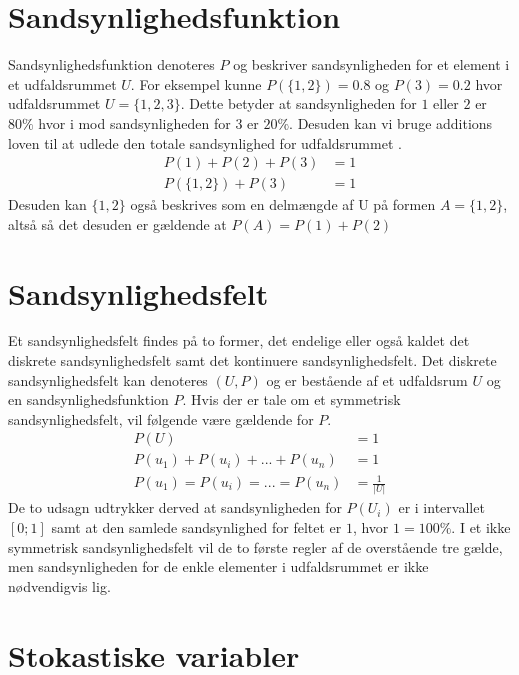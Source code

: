 \documentclass[../../SRP.tex]{subfiles}
\begin{document}
\section{Sandsynlighedsfunktion}

Sandsynlighedsfunktion denoteres $P$ og beskriver sandsynligheden for et element i et udfaldsrummet $U$. For eksempel kunne $P(\{1,2\}) = 0.8$ og $P(3) = 0.2$ hvor udfaldsrummet $U = \{1,2,3\}$. Dette betyder at sandsynligheden for $1$ eller $2$ er $80\%$ hvor i mod sandsynligheden for $3$ er $20\%$. Desuden kan vi bruge additions loven til at udlede den totale sandsynlighed for udfaldsrummet \cite{SC}.
\begin{align}
  P(1) + P(2) + P(3) &= 1 \\
  P(\{1,2\}) + P(3) &= 1
\end{align}
Desuden kan $\{1,2\}$ også beskrives som en delmængde af U på formen $A = \{1,2\}$, altså så det desuden er gældende at $P(A) = P(1) + P(2)$

\section{Sandsynlighedsfelt}

Et sandsynlighedsfelt findes på to former, det endelige eller også kaldet det diskrete sandsynlighedsfelt samt det kontinuere sandsynlighedsfelt. Det diskrete sandsynlighedsfelt kan denoteres $(U, P)$ og er bestående af et udfaldsrum $U$ og en sandsynlighedsfunktion $P$. Hvis der er tale om et symmetrisk sandsynlighedsfelt, vil følgende være gældende for $P$.
\begin{align}
  P(U) &= 1 \\
  P(u_1) + P(u_i) + ... + P(u_n) &= 1 \\
  P(u_1) = P(u_i) = ... = P(u_n) &= \frac{1}{|U|}
\end{align}
De to udsagn udtrykker derved at sandsynligheden for $P(U_i)$ er i intervallet $[0;1]$ samt at den samlede sandsynlighed for feltet er $1$, hvor $1 = 100\%$. I et ikke symmetrisk sandsynlighedsfelt vil de to første regler af de overstående tre gælde, men sandsynligheden for de enkle elementer i udfaldsrummet er ikke nødvendigvis lig. \\

\section{Stokastiske variabler}
\end{document}
